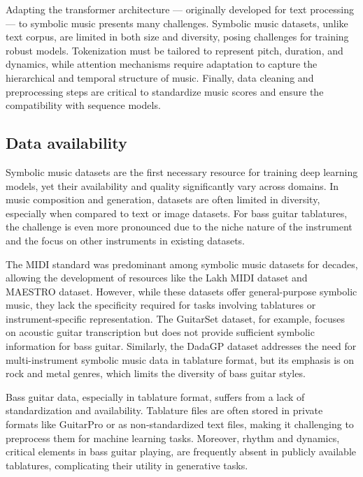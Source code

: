 Adapting the transformer architecture — originally developed for text processing — to symbolic music presents many challenges.
Symbolic music datasets, unlike text corpus, are limited in both size and diversity, posing challenges for training robust models\cite{le_natural_2024}.
Tokenization must be tailored to represent pitch, duration, and dynamics, while attention mechanisms require adaptation to capture the hierarchical and temporal structure of music.
Finally, data cleaning and preprocessing steps are critical to standardize music scores and ensure the compatibility with sequence models.


\subsection{Data availability}


Symbolic music datasets are the first necessary resource for training deep learning models, yet their availability and quality significantly vary across domains.
In music composition and generation, datasets are often limited in diversity, especially when compared to text or image datasets.
For bass guitar tablatures, the challenge is even more pronounced due to the niche nature of the instrument and the focus on other instruments in existing datasets.

The MIDI standard was predominant among symbolic music datasets for decades, allowing the development of resources like the Lakh MIDI dataset and MAESTRO dataset.
However, while these datasets offer general-purpose symbolic music, they lack the specificity required for tasks involving tablatures or instrument-specific representation.
The GuitarSet dataset, for example, focuses on acoustic guitar transcription but does not provide sufficient symbolic information for bass guitar.
Similarly, the DadaGP dataset addresses the need for multi-instrument symbolic music data in tablature format, but its emphasis is on rock and metal genres, which limits the diversity of bass guitar styles\cite{sarmento_dadagp_2021}.


Bass guitar data, especially in tablature format, suffers from a lack of standardization and availability.
Tablature files are often stored in private formats like GuitarPro or as non-standardized text files, making it challenging to preprocess them for machine learning tasks\cite{sarmento_dadagp_2021}.
Moreover, rhythm and dynamics, critical elements in bass guitar playing, are frequently absent in publicly available tablatures, complicating their utility in generative tasks.


